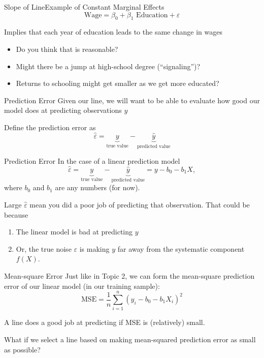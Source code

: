 \documentclass[aspectratio=169,t,11pt,table]{beamer}
\begin{document}
\begin{frame}{Slope of Line}{Example of Constant Marginal Effects}
  \vspace*{-2\bigskipamount}
  $$
    \text{Wage} = \beta_0 + \beta_1 \text{ Education} + \varepsilon
  $$

  Implies that each year of education leads to the same change in wages
  \begin{itemize}
    \item Do you think that is reasonable?
    
    \pause
    \item Might there be a jump at high-school degree (``signaling'')?
    
    \item Returns to schooling might get smaller as we get more educated?
  \end{itemize}
\end{frame}



\begin{frame}{Prediction Error}
  Given our line, we will want to be able to evaluate how good our model does at predicting observations $y$

  \bigskip
  Define the \alert{prediction error} as 
  $$
    \hat{\varepsilon} = \underbrace{y}_{\text{true value}} - \underbrace{\hat{y}}_{\text{predicted value}} 
  $$

\end{frame}

\begin{frame}{Prediction Error}
  In the case of a linear prediction model
  $$
    \hat{\varepsilon} = \underbrace{y}_{\text{true value}} - \underbrace{\hat{y}}_{\text{predicted value}} = y - b_0 - b_1 X,
  $$
  where $b_0$ and $b_1$ are any numbers (for now).

  \bigskip
  Large $\hat{\varepsilon}$ mean you did a poor job of predicting that observation. That could be because
  \begin{enumerate}
    \item The linear model is bad at predicting $y$
    \item Or, the true noise $\varepsilon$ is making $y$ far away from the systematic component $f(X)$.
  \end{enumerate}
\end{frame}


\begin{frame}{Mean-square Error}
  Just like in Topic 2, we can form the mean-square prediction error of our linear model (in our training sample):
  $$
    \text{MSE} = \frac{1}{n} \sum_{i=1}^n (y_i - b_0 - b_1 X_i)^2
  $$

  \bigskip
  A line does a good job at predicting if MSE is (relatively) small. 

  \pause
  \bigskip
  What if we select a line based on making mean-squared prediction error as small as possible?
\end{frame}
\end{document}
